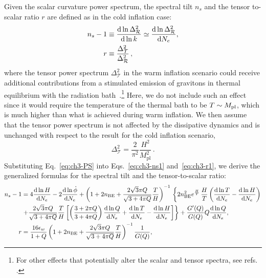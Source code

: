 Given the scalar curvature power spectrum, the spectral tilt $n_s$ and the tensor to-scalar ratio $r$ are defined as in the cold inflation case:
\begin{align}
    n_s-1& \equiv \frac{{\rm d}\ln \Delta^2_{\mathcal{R}}}{{\rm d}\ln k}\simeq \frac{{\rm d}\ln \Delta^2_{\mathcal{R}}}{{\rm d}N_e},\label{eq:ch3-ns1} \\
    r& \equiv \frac{\Delta_{\mathcal{T}}^2}{\Delta^2_{\mathcal{R}}}\,, \label{eq:ch3-r1}
\end{align}
where the tensor power spectrum $\Delta^2_{\mathcal{T}}$ in the warm inflation scenario could receive additional contributions from a stimulated emission of gravitons in thermal equilibrium with the radiation bath~\cite{Bhattacharya:2006dm}.\footnote{For other effects that potentially alter the scalar and tensor spectra, see refs. \cite{Namba:2015gja,Peloso:2016gqs}.} Here, we do not include such an effect since it would require the temperature of the thermal bath to be $T \sim M_{\rm pl}$, which is much higher than what is achieved during warm inflation. We then assume that the tensor power spectrum is not affected by the dissipative dynamics and is unchanged with respect to the result for the cold inflation scenario,
\begin{equation}
    \Delta^2_{\mathcal{T}} = \frac{2}{\pi^2} \frac{H^2}{M_{\mathrm{pl}}^2}\,.
\end{equation}
Substituting Eq.~\ref{eq:ch3-PS} into Eqs.~\ref{eq:ch3-ns1} and~\ref{eq:ch3-r1}, we derive the generalized formulas for the spectral tilt and the tensor-to-scalar ratio:
{\small
\begin{align}
    n_s-1&=4\frac{{\rm d}\ln H}{{\rm d}N_e}-2\frac{{\rm d}\ln \dot{\phi}}{{\rm d}N_e}+\left(1+2 n_{\mathrm{BE}}+\frac{2 \sqrt{3} \pi Q}{\sqrt{3+4 \pi Q}} \frac{T}{H}\right)^{-1}\,\left\{ 2n_{\mathrm{BE}}^2e^{\frac{H}{T}}\,\frac{H}{T}\left(\frac{{\rm d}\ln T}{{\rm d}N_e}-\frac{{\rm d}\ln H}{{\rm d}N_e}\right)\right. \nonumber \\
    &\left. +\frac{2 \sqrt{3} \pi Q}{\sqrt{3+4 \pi Q}} \frac{T}{H}\left[ \left(\frac{3+2\pi Q}{3+4\pi Q}\right)\frac{{\rm d}\ln Q}{{\rm d}N_e}+\frac{{\rm d}\ln T}{{\rm d}N_e}-\frac{{\rm d}\ln H}{{\rm d}N_e}\right]\right\} +\frac{ G^\prime(Q)}{G(Q)}Q\frac{{\rm d}\ln Q}{{\rm d}N_e}, \label{eq:ch3-ns2}\\
     r&=\frac{16 \epsilon_{w}}{1+Q}\left(1+2 n_{\mathrm{BE}}+\frac{2 \sqrt{3} \pi Q}{\sqrt{3+4 \pi Q}} \frac{T}{H}\right)^{-1} \frac{1}{G(Q)}, \label{eq:ch3-r2}
\end{align}
}
